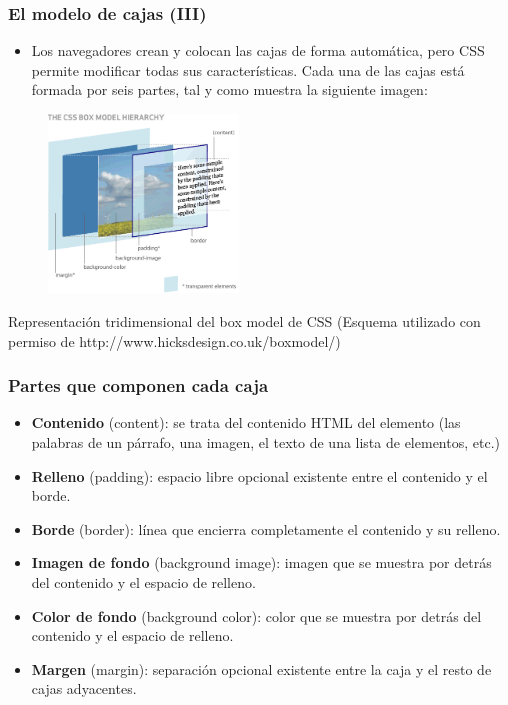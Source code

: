 
\begin{frame}
\frametitle{El modelo de cajas (III)}

\begin{itemize}
  \item Los navegadores crean y colocan las cajas de forma automática, pero CSS permite modificar todas sus características. Cada una de las cajas está formada por seis partes, tal y como muestra la siguiente imagen:
\end{itemize}


\begin{center}
\begin{figure}[p]
\includegraphics[width=0.45\textwidth]{figs/f0403.png}
\end{figure}
\end{center}
{\footnotesize
 Representación tridimensional del box model de CSS
(Esquema utilizado con permiso de http://www.hicksdesign.co.uk/boxmodel/)
}
\end{frame}


\begin{frame}
\frametitle{Partes que componen cada caja}

\begin{itemize}
  \item {\bf Contenido} (content): se trata del contenido HTML del elemento (las palabras de un párrafo, una imagen, el texto de una lista de elementos, etc.)
  \item {\bf Relleno} (padding): espacio libre opcional existente entre el contenido y el borde.
  \item {\bf Borde} (border): línea que encierra completamente el contenido y su relleno.
  \item {\bf Imagen de fondo} (background image): imagen que se muestra por detrás del contenido y el espacio de relleno.
  \item {\bf Color de fondo} (background color): color que se muestra por detrás del contenido y el espacio de relleno.
  \item {\bf Margen} (margin): separación opcional existente entre la caja y el resto de cajas adyacentes.
\end{itemize}

\end{frame}


